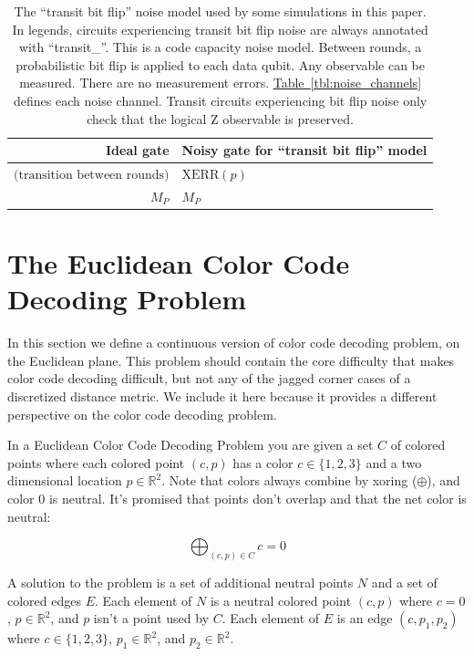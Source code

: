 \documentclass[onecolumn,unpublished,a4paper]{quantumarticle}
\theoremstyle{definition}
\theoremstyle{definition}
\theoremstyle{definition}
\newcommand{\tbl}[1]{\hyperref[tbl:#1]{Table~\ref*{tbl:#1}}}
\begin{document}
\begin{table}[H]
    \centering
    \begin{tabular}{|r|l|}
    \hline
    Ideal gate & Noisy gate for ``transit bit flip'' model
    \\
    \hline
    $\text{(transition between rounds)}$ & $\text{XERR}(p)$ \\
    \hline
    $M_{P}$ & $M_{P}$
    \\
    \hline
    \end{tabular}
    \caption{
        The ``transit bit flip'' noise model used by some simulations in this paper.
        In legends, circuits experiencing transit bit flip noise are always annotated with ``transit\_''.
        This is a code capacity noise model.
        Between rounds, a probabilistic bit flip is applied to each data qubit.
        Any observable can be measured.
        There are no measurement errors.
        \tbl{noise_channels} defines each noise channel.
        Transit circuits experiencing bit flip noise only check that the logical Z observable is preserved.
    }
    \label{tbl:noise_model_transit}
\end{table}


\clearpage
\section{The Euclidean Color Code Decoding Problem}
\label{app:euclidean_decoding}

In this section we define a continuous version of color code decoding problem, on the Euclidean plane.
This problem should contain the core difficulty that makes color code decoding difficult, but not any of the jagged corner cases of a discretized distance metric.
We include it here because it provides a different perspective on the color code decoding problem.

In a Euclidean Color Code Decoding Problem you are given a set $C$ of colored points where each colored point $(c, p)$ has a color $c \in \{1, 2, 3\}$ and a two dimensional location $p \in \mathbb{R}^2$.
Note that colors always combine by xoring ($\oplus$), and color 0 is neutral.
It's promised that points don't overlap and that the net color is neutral:

$$\bigoplus_{(c, p) \in C} c = 0$$

A solution to the problem is a set of additional neutral points $N$ and a set of colored edges $E$.
Each element of $N$ is a neutral colored point $(c, p)$ where $c=0$, $p \in \mathbb{R}^2$, and $p$ isn't a point used by $C$.
Each element of $E$ is an edge $(c, p_1, p_2)$ where $c \in \{1, 2, 3\}$, $p_1 \in \mathbb{R}^2$, and $p_2 \in \mathbb{R}^2$.
\end{document}
